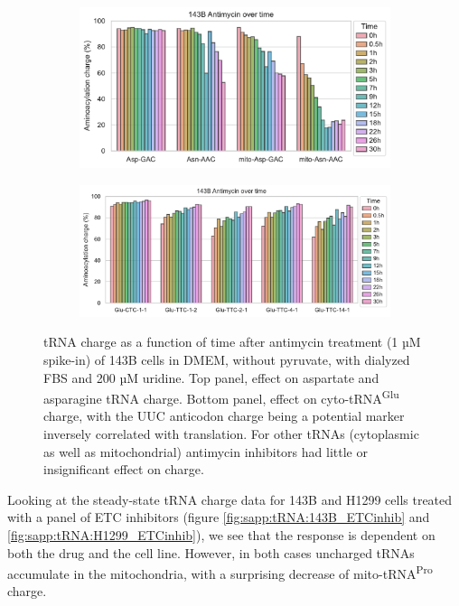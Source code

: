 \begin{figure}[!ht]
     \centering
     \begin{subfigure}[b]{0.6\textwidth}
         \includegraphics[width=\textwidth]{figures/sapp/tRNA/143B_Anti-time_Asp-Asn.pdf}
     \end{subfigure}
     \begin{subfigure}[b]{0.7\textwidth}
         \vspace{5pt}
         \includegraphics[width=\textwidth]{figures/sapp/tRNA/143B_Anti-time_Glu.pdf}
     \end{subfigure}
     \hfill
        \caption[Antimycin time-series in 143B, effect on tRNA charge.]{
        tRNA charge as a function of time after antimycin treatment (1 µM spike-in) of 143B cells in DMEM, without pyruvate, with dialyzed FBS and 200 µM uridine.
        Top panel, effect on aspartate and asparagine tRNA charge.
        Bottom panel, effect on cyto-tRNA\textsuperscript{Glu} charge, with the UUC anticodon charge being a potential marker inversely correlated with translation.
        For other tRNAs (cytoplasmic as well as mitochondrial) antimycin inhibitors had little or insignificant effect on charge.
        }
        \label{fig:sapp:tRNA:143B_Anti_time}
\end{figure}


\FloatBarrier
Looking at the steady-state tRNA charge data for 143B and H1299 cells treated with a panel of ETC inhibitors (figure \ref{fig:sapp:tRNA:143B_ETCinhib} and \ref{fig:sapp:tRNA:H1299_ETCinhib}), we see that the response is dependent on both the drug and the cell line.
However, in both cases uncharged tRNAs accumulate in the mitochondria, with a surprising decrease of mito-tRNA\textsuperscript{Pro} charge.

